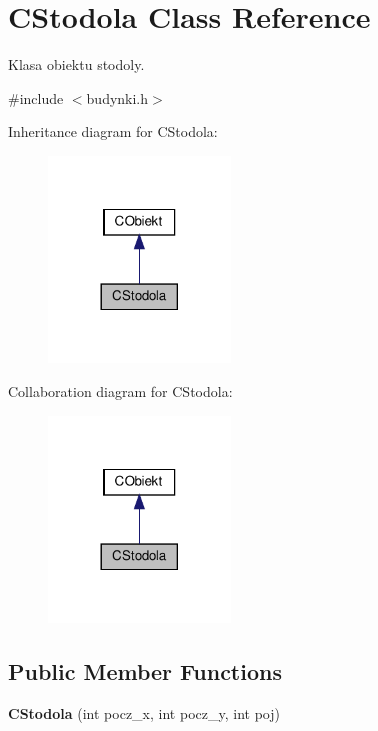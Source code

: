 \hypertarget{class_c_stodola}{}\section{C\+Stodola Class Reference}
\label{class_c_stodola}


Klasa obiektu stodoly.  




{\ttfamily \#include $<$budynki.\+h$>$}



Inheritance diagram for C\+Stodola\+:\nopagebreak
\begin{figure}[H]
\begin{center}
\leavevmode
\includegraphics[width=137pt]{class_c_stodola__inherit__graph}
\end{center}
\end{figure}


Collaboration diagram for C\+Stodola\+:\nopagebreak
\begin{figure}[H]
\begin{center}
\leavevmode
\includegraphics[width=137pt]{class_c_stodola__coll__graph}
\end{center}
\end{figure}
\subsection*{Public Member Functions}
\begin{DoxyCompactItemize}
\item 
\mbox{\label{class_c_stodola_ab8eab171c8a007c690d0e8d69be39b6b}} 
{\bfseries C\+Stodola} (int pocz\+\_\+x, int pocz\+\_\+y, int poj)
\end{DoxyCompactItemize}
